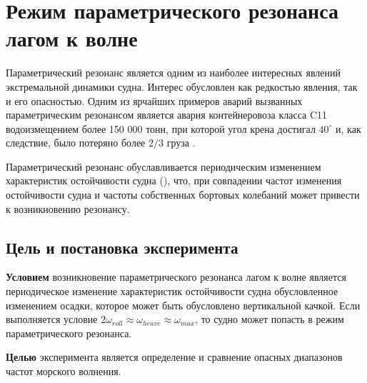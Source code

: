 \section{Режим параметрического резонанса лагом к волне}

Параметрический резонанс является одним из наиболее интересных явлений экстремальной динамики судна.
Интерес обусловлен как редкостью явления, так и его опасностью. 
Одним из ярчайших примеров аварий вызванных параметрическим резонансом является 
авария контейнеровоза класса C11 водоизмещением более 150 000 тонн, при которой 
угол крена достигал $40^{\circ}$ и, как следствие, было потеряно более $2/3$ 
груза \citep{c11}.

Параметрический резонанс обуславливается периодическим изменением характеристик остойчивости судна (), что, при совпадении частот изменения остойчивости судна  и частоты собственных 
бортовых колебаний может привести к возникновению резонансу. 



\subsection{Цель и постановка эксперимента}

\textbf{Условием} возникновение параметрического резонанса  лагом к волне является периодическое изменение характеристик остойчивости судна обусловленное изменением осадки, которое может быть обусловлено вертикальной качкой. Если выполняется условие $2 \omega_{roll} \approx \omega_{heave} \approx \omega_{max}$, то судно может попасть в режим параметрического резонанса.

\textbf{Целью} эксперимента является определение и сравнение опасных диапазонов частот морского волнения.

